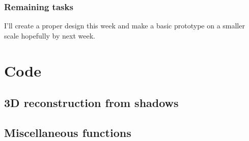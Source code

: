\documentclass[a4paper]{article}
\begin{document}
\subsubsection{Remaining tasks}
I'll create a proper design this week and make a basic prototype on a smaller scale hopefully by next week.

\newpage
\section{Code}
\subsection{3D reconstruction from shadows}
\label{alg:shadow}

\subsection{Miscellaneous functions}
\label{alg:misc}

\end{document}
